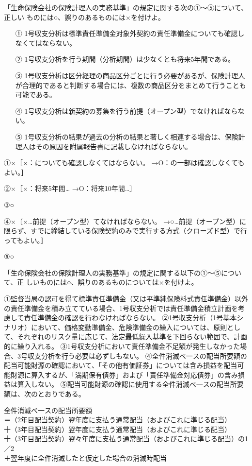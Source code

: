 \documentclass[report,gutter=10mm,fore-edge=10mm,uplatex,dvipdfmx]{jlreq}
\begin{document}
「生命保険会社の保険計理人の実務基準」の規定に関する次の①〜⑤について、正しい
ものには○、誤りのあるものには×を付けよ。

\begin{itemize}
\item[ ①] 1号収支分析は標準責任準備金対象外契約の責任準備金についても確認しなくてはならない。
\item[ ②] 1号収支分析を行う期間（分析期間）は少なくとも将来5年間である。
\item[ ③] 1号収支分析は区分経理の商品区分ごとに行う必要があるが、保険計理人が合理的であると判断する場合には、複数の商品区分をまとめて行うことも可能である。
\item[ ④] 1号収支分析は新契約の募集を行う前提（オープン型）でなければならない。
\item[ ⑤] 1号収支分析の結果が過去の分析の結果と著しく相連する場合は、保険計理人はその原因を附属報告書に記載しなければならない。
\end{itemize}

\answer{}
①×［×：についても確認しなくてはならない。
→O：の一部は確認しなくてもよい。］

②×［×：将来5年間…
→O：将来10年間…］

③○

④×〔×…前提（オープン型）てなければならない。
→○…前提（オープン型）に限らず、すでに締結している保険契約のみで実行する方式（クローズド型）で行ってもよい。］

⑤○

「生命保険会社の保険計理人の実務基準」の規定に関する以下の①〜⑤について、正
しいものには○、誤りのあるものについては×を付けよ。

①監督当局の認可を得て標準責任準備金（又は平準純保険料式責任準備金）以外の責任準備金を積み立てている場合、1号収支分析では責任準備金積立計画を考慮して責任準備金の確認を行わなければならない。
②1号収支分析（1号基本シナリオ）において、価格変動準備金、危険準備金の繰入については、原則として、それぞれのリスク量に応じて、法定最低繰入基準を下回らない範囲で、計画的に繰り入れる。
③1号収支分析において責任準備金不足額が発生しなかった場合、3号収支分析を行う必要は必ずしもない。
④全件消滅べ一スの配当所要額の配当可能財源の確認において、「その他有価証券」については含み損益を配当可能財源に算入するが、「満期保有債券」および「責任準備金対応債券」の含み損益は算入しない。
⑤配当可能財源の確認に使用する全件消滅べ一スの配当所要額は、次のとおりである。

全件消滅べ一スの配当所要額\\
＝（2年目配当契約）翌年度に支払う通常配当（およびこれに準じる配当）\\
十（3年目配当契約）翌年度に支払う通常配当（およびこれに準じる配当）\\
十（3年目配当契約）翌々年度に支払う通常配当（およびこれに準じる配当）の1／2\\
＋翌年度に全件消滅したと仮定した場合の消滅時配当
\end{document}
